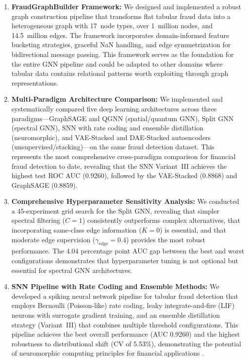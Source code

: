 \begin{enumerate}[label=\arabic*.]
\item \textbf{FraudGraphBuilder Framework:} We designed and implemented a robust graph construction pipeline that transforms flat tabular fraud data into a heterogeneous graph with 17~node types, over 1~million nodes, and 14.5~million edges. The framework incorporates domain-informed feature bucketing strategies, graceful NaN handling, and edge symmetrization for bidirectional message passing. This framework serves as the foundation for the entire GNN pipeline and could be adapted to other domains where tabular data contains relational patterns worth exploiting through graph representations.

\item \textbf{Multi-Paradigm Architecture Comparison:} We implemented and systematically compared five deep learning architectures across three paradigms---GraphSAGE and QGNN (spatial/quantum GNN), Split GNN (spectral GNN), SNN with rate coding and ensemble distillation (neuromorphic), and VAE-Stacked and DAE-Stacked autoencoders (unsupervised/stacking)---on the same fraud detection dataset. This represents the most comprehensive cross-paradigm comparison for financial fraud detection to date, revealing that the SNN Variant~III achieves the highest test ROC AUC (0.9260), followed by the VAE-Stacked (0.8868) and GraphSAGE (0.8859).

\item \textbf{Comprehensive Hyperparameter Sensitivity Analysis:} We conducted a 45-experiment grid search for the Split GNN, revealing that simpler spectral filtering ($C=1$) consistently outperforms complex alternatives, that incorporating same-class edge information ($K=0$) is essential, and that moderate edge supervision ($\gamma_{\text{edge}} = 0.4$) provides the most robust performance. The 4.04 percentage point AUC gap between the best and worst configurations demonstrates that hyperparameter tuning is not optional but essential for spectral GNN architectures.

\item \textbf{SNN Pipeline with Rate Coding and Ensemble Methods:} We developed a spiking neural network pipeline for tabular fraud detection that employs Bernoulli (Poisson-like) rate coding, leaky integrate-and-fire (LIF) neurons with surrogate gradient training, and an ensemble distillation strategy (Variant~III) that combines multiple threshold configurations. This pipeline achieves the best overall performance (AUC 0.9260) and the highest robustness to distributional shift (CV of 5.53\%), demonstrating the potential of neuromorphic computing principles for financial applications \cite{nasif2026reinforcement}.


\end{enumerate}
